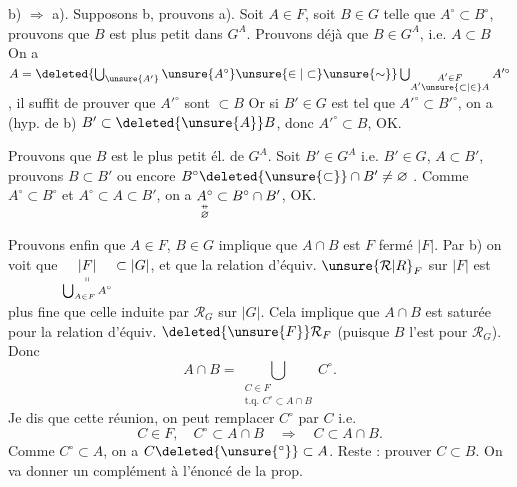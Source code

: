 b) $\Longrightarrow$ a). Supposons b, prouvons a). Soit $A\in F$, soit $B\in G$ telle que $A^\circ\subset B^\circ$, prouvons que $B$ est plus petit  dans $G^A$.
Prouvons déjà que $B\in G^A$, i.e. $A\subset B$ 
 On a $A=\deleted{\bigcup_{\unsure{A'}}\unsure{A^\circ}\unsure{\in|\subset}\unsure{\sim}}\bigcup_{\substack{A'\in F\\ A'\unsure{\subset|\in} A}} A'^\circ$,  il suffit de prouver que  $A'^\circ$ sont $\subset B$
Or si $B'\in G$ est tel que $A'^\circ\subset B'^\circ$, on a  (hyp. de b) $B'\subset \deleted{\unsure{A}}B$, donc $A'^\circ\subset B$, OK.

Prouvons que $B$ est le plus petit él. de $G^A$. Soit $B'\in G^A$ i.e. $B'\in G$, $A\subset B'$, prouvons $B\subset B'$ ou encore $B^\circ\deleted{\unsure{\subset}}\cap B'\ne\varnothing$ . Comme
$A^\circ\subset B^\circ$ et $A^\circ\subset A\subset B'$, on a $\underset{\substack{\mathrel{\ooalign{\hfil$\scriptstyle\shortparallel$\hfil\cr\hfil$\scriptstyle-$\hfil\cr}}\\ \varnothing}}{A^\circ}\subset B^\circ\cap B'$, OK.

Prouvons enfin que $A\in F$, $B\in G$ implique que $A\cap B$ est $F$ fermé  $|F|$. Par b) on voit que $\underset{\substack{\shortparallel\\ \bigcup_{A\in F}A^\circ}}{|F|}\subset|G|$, et que
la relation d'équiv. $\unsure{\mathcal R|R}_F$ sur $|F|$ est plus fine que celle induite par $\mathcal R_G$ sur $|G|$. Cela implique que $A\cap B$ est saturée pour la relation d'équiv. $\deleted{\unsure{F}}\mathcal R_F$ (puisque $B$ l'est pour $\mathcal R_G$). Donc
\[ A\cap B=\bigcup_{\substack{C\in F\\ \text{t.q. } C^\circ\subset A\cap B}} C^\circ . \]
Je dis que  cette réunion,  on peut remplacer $C^\circ$ par $C$ i.e.
\[ C\in F,\quad C^\circ\subset A\cap B\quad\Longrightarrow\quad C\subset A\cap B. \]
Comme $C^\circ\subset A$, on a $C\deleted{\unsure{{}^\circ}}\subset A$. Reste : prouver $C\subset B$. On va donner un complément  à l'énoncé de la prop.

